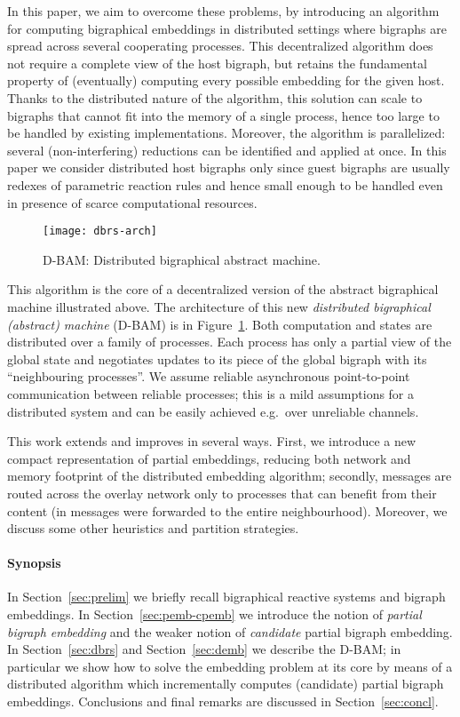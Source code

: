 \documentclass[a4paper,english,10pt]{article}
\theoremstyle{plain}\newtheorem{theorem}{Theorem}
\theoremstyle{plain}\newtheorem{corollary}[theorem]{Corollary}
\theoremstyle{plain}\newtheorem{proposition}[theorem]{Proposition}
\theoremstyle{plain}\newtheorem{lemma}[theorem]{Lemma}
\theoremstyle{plain}\newtheorem{definition}{Definition}
\theoremstyle{plain}\newtheorem{remark}{Remark}
\theoremstyle{plain}\newtheorem{example}[remark]{Example}
\newcommand{\?}[1]{}
\begin{document}
In this paper, we aim to overcome these problems, by introducing an
algorithm for computing bigraphical embeddings in distributed settings
where bigraphs are spread across several cooperating processes. This
decentralized algorithm does not require a complete view of the host
bigraph, but retains the fundamental property of (eventually) computing every
possible embedding for the given host.  Thanks to the distributed
nature of the algorithm, this solution can scale to bigraphs that
cannot fit into the memory of a single process, hence too large to be
handled by existing implementations.  Moreover, the algorithm is
parallelized: several (non-interfering) reductions can be identified
and applied at once. In this paper we consider distributed host bigraphs only
since guest bigraphs are usually redexes of parametric reaction rules and
hence small enough to be handled even in presence
of scarce computational resources.

\begin{figure}[t]
	\centering
	\texttt{[image: dbrs-arch]}
	\caption{D-BAM: Distributed bigraphical abstract machine.}
	\label{fig:dbrs-arch}
\end{figure}

This algorithm is the core of a decentralized version of the abstract
bigraphical machine illustrated above. The architecture of this new
\emph{distributed bigraphical (abstract) machine} (D-BAM) is in
Figure~\ref{fig:dbrs-arch}.  Both computation and states are
distributed over a family of processes. Each process has only a
partial view of the global state and negotiates updates to its piece
of the global bigraph with its ``neighbouring processes''.  We assume
reliable asynchronous point-to-point communication between reliable
processes; this is a mild assumptions for a distributed system and can
be easily achieved e.g.~over unreliable channels.

This work extends and improves \cite{mpm:gcm14w} in several ways.
First, we introduce a new compact representation of partial
embeddings, reducing both network and memory footprint of the
distributed embedding algorithm; secondly, messages are routed across
the overlay network only to processes that can benefit from their
content (in \cite{mpm:gcm14w} messages were forwarded to the entire
neighbourhood). Moreover, we discuss some other heuristics and
partition strategies.

\paragraph{Synopsis}
In Section~\ref{sec:prelim} we briefly recall bigraphical reactive
systems and bigraph embeddings.  In Section~\ref{sec:pemb-cpemb} we
introduce the notion of \emph{partial bigraph embedding} and the
weaker notion of \emph{candidate} partial bigraph embedding.  In
Section~\ref{sec:dbrs} and Section~\ref{sec:demb} we describe the
D-BAM; in particular we show how to solve the embedding problem at its
core by means of a distributed algorithm which incrementally computes
(candidate) partial bigraph embeddings.  Conclusions and final remarks
are discussed in Section~\ref{sec:concl}.
\end{document}
